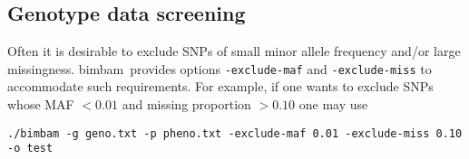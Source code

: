 \documentclass[11pt,Palatino]{article}
\def\bimbam{{\sc bimbam}~}
\begin{document}








\subsection{Genotype data screening}

Often it is desirable to exclude SNPs of small minor allele frequency and/or large missingness. \bimbam provides options {\tt -exclude-maf} and {\tt -exclude-miss} to accommodate such requirements. For example, if one wants to exclude SNPs whose MAF $< 0.01$ and missing proportion $> 0.10$ one may use  
\begin{verbatim}
./bimbam -g geno.txt -p pheno.txt -exclude-maf 0.01 -exclude-miss 0.10 -o test
\end{verbatim}
\end{document}
